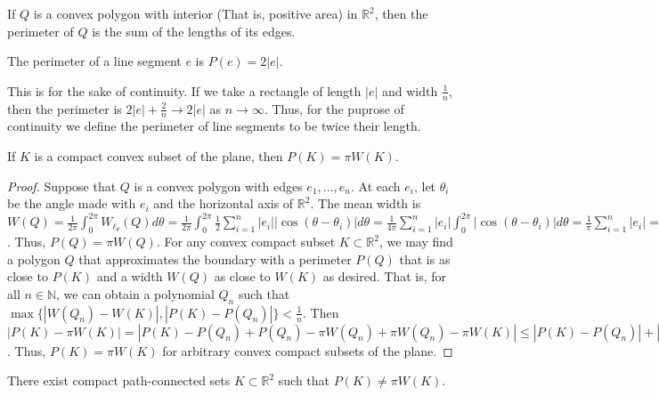 \documentclass[crop=false,class=article,oneside]{standalone}
\begin{document}
        \begin{definition}
        If $Q$ is a convex polygon with interior (That is, positive area) in $\mathbb{R}^2$, then the perimeter of $Q$ is the sum of the lengths of its edges. 
        \end{definition}
        \begin{definition}
        The perimeter of a line segment $e$ is $P(e) = 2|e|$.
        \end{definition}
        \begin{remark}
        This is for the sake of continuity. If we take a rectangle of length $|e|$ and width $\frac{1}{n}$, then the perimeter is $2|e|+\frac{2}{n} \rightarrow 2|e|$ as $n\rightarrow \infty$. Thus, for the puprose of continuity we define the perimeter of line segments to be twice their length.
        \end{remark}
        \begin{theorem}
        If $K$ is a compact convex subset of the plane, then $P(K) = \pi W(K)$.
        \end{theorem}
        \begin{proof}
        Suppose that $Q$ is a convex polygon with edges $e_1,\hdots, e_n$. At each $e_i$, let $\theta_i$ be the angle made with $e_i$ and the horizontal axis of $\mathbb{R}^2$. The mean width is $W(Q) = \frac{1}{2\pi}\int_{0}^{2\pi} W_{\ell_\theta}(Q)d\theta = \frac{1}{2\pi} \int_{0}^{2\pi} \frac{1}{2} \sum_{i=1}^{n} |e_i||\cos(\theta-\theta_i)|d\theta = \frac{1}{4\pi}\sum_{i=1}^{n} |e_i|\int_{0}^{2\pi} |\cos(\theta-\theta_i)|d\theta = \frac{1}{\pi} \sum_{i=1}^{n} |e_i| = \frac{1}{\pi} P(Q)$. Thus, $P(Q) = \pi W(Q)$. For any convex compact subset $K\subset \mathbb{R}^2$, we may find a polygon $Q$ that approximates the boundary with a perimeter $P(Q)$ that is as close to $P(K)$ and a width $W(Q)$ as close to $W(K)$ as desired. That is, for all $n\in \mathbb{N}$, we can obtain a polynomial $Q_n$ such that $\max\{|W(Q_n)-W(K)|,|P(K)-P(Q_n)|\}< \frac{1}{n}$. Then $|P(K)-\pi W(K)| = |P(K) - P(Q_n)+P(Q_n)-\pi W(Q_n)+\pi W(Q_n)-\pi W(K)| \leq |P(K)-P(Q_n)|+|P(Q_n)-\pi W(Q_n)|+\pi|W(Q_n)-W(K)| < \frac{1}{n} + 0 + \frac{\pi}{n} = \frac{1+\pi}{n} \rightarrow 0$. Thus, $P(K) = \pi W(K)$ for arbitrary convex compact subsets of the plane.
        \end{proof}
        \begin{theorem}
        There exist compact path-connected sets $K\subset \mathbb{R}^2$ such that $P(K) \ne \pi W(K)$.
        \end{theorem}
\end{document}
